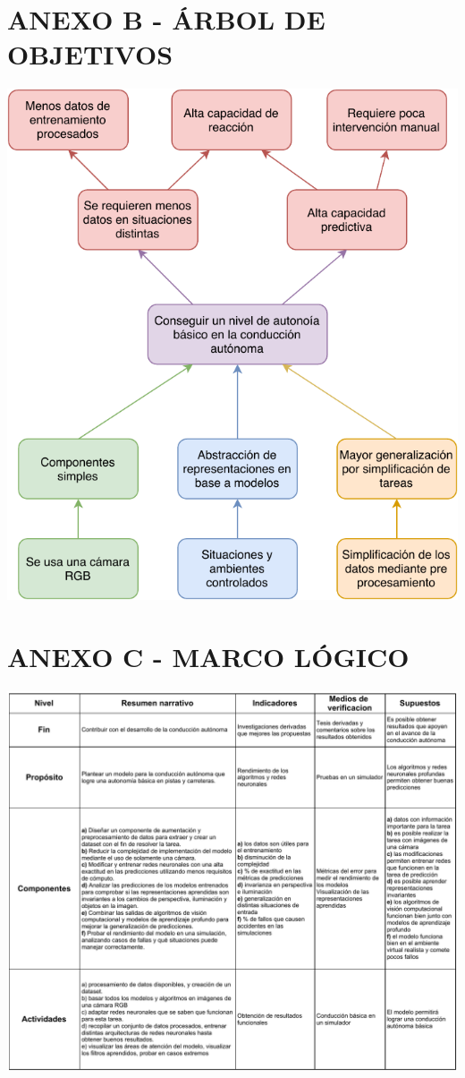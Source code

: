 \section*{ANEXO B - ÁRBOL DE OBJETIVOS}
\begin{center}
	\includegraphics[scale=1]{imagenes/arbol_de_objetivos}
\end{center}
\newpage
\section*{ANEXO C - MARCO LÓGICO}
\begin{center}
    \includegraphics[scale=0.8]{imagenes/MarcoLogico}
\end{center}
\newpage

